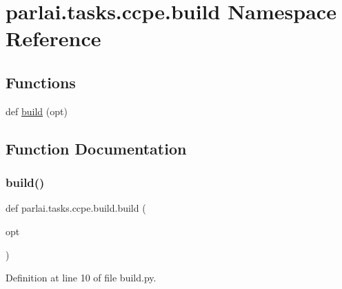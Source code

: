 \hypertarget{namespaceparlai_1_1tasks_1_1ccpe_1_1build}{}\section{parlai.\+tasks.\+ccpe.\+build Namespace Reference}
\label{namespaceparlai_1_1tasks_1_1ccpe_1_1build}
\subsection*{Functions}
\begin{DoxyCompactItemize}
\item 
def \hyperlink{namespaceparlai_1_1tasks_1_1ccpe_1_1build_a3c36666a37a2334071b6372b999d94ca}{build} (opt)
\end{DoxyCompactItemize}


\subsection{Function Documentation}
\mbox{\label{namespaceparlai_1_1tasks_1_1ccpe_1_1build_a3c36666a37a2334071b6372b999d94ca}} 
\subsubsection{\texorpdfstring{build()}{build()}}
{\footnotesize\ttfamily def parlai.\+tasks.\+ccpe.\+build.\+build (\begin{DoxyParamCaption}\item[{}]{opt }\end{DoxyParamCaption})}



Definition at line 10 of file build.\+py.

